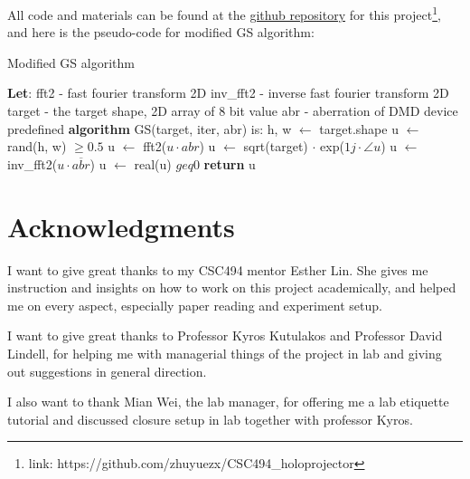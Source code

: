 \documentclass[10pt,journal,compsoc]{IEEEtran}
\newif\ifpeerreview
\begin{document}
All code and materials can be found at the \href{https://github.com/zhuyuezx/CSC494_holoprojector}{github repository} for this project\footnote{link: https://github.com/zhuyuezx/CSC494\_holoprojector}, and here is the pseudo-code for modified GS algorithm:
\begin{algorithm}
\caption{Modified GS algorithm}\label{alg:cap}
\begin{algorithmic}[1]
\State \textbf{Let}:
    \State fft2 - fast fourier transform 2D
    \State inv\_fft2 - inverse fast fourier transform 2D
    \State target - the target shape, 2D array of 8 bit value
    \State abr - aberration of DMD device predefined
\State
\State \textbf{algorithm} GS(target, iter, abr) is:
\State h, w $\gets$ target.shape
\State u $\gets$ rand(h, w) $\geq 0.5$ 
    \State u $\gets$ fft2($u \cdot abr$) 
    \State u $\gets$ sqrt(target) $\cdot$ exp($1j \cdot \angle u$) 
    \State u $\gets$ inv\_fft2($u \cdot \overline{abr}$) 
    \State u $\gets$ real(u) $geq 0$ 
\EndFor
\State
\State \textbf{return} u
\end{algorithmic}
\end{algorithm}

\ifpeerreview \else
\section*{Acknowledgments}

I want to give great thanks to my CSC494 mentor Esther Lin. She gives me instruction and insights on how to work on this project academically, and helped me on every aspect, especially paper reading and experiment setup. 

I want to give great thanks to Professor Kyros Kutulakos and Professor David Lindell, for helping me with managerial things of the project in lab and giving out suggestions in general direction.

I also want to thank Mian Wei, the lab manager, for offering me a lab etiquette tutorial and discussed closure setup in lab together with professor Kyros.



\fi


\end{document}
